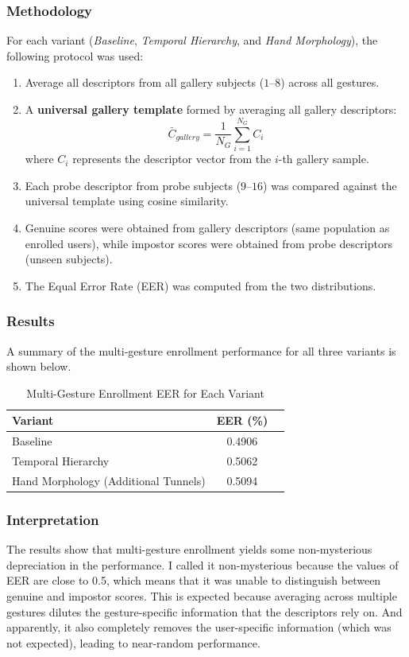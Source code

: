 \subsubsection*{Methodology}
For each variant (\textit{Baseline}, \textit{Temporal Hierarchy}, and \textit{Hand Morphology}),
the following protocol was used:
\begin{enumerate}
    \item Average all descriptors from all gallery subjects (\(1 \text{–} 8\)) across all gestures.
    \item A \textbf{universal gallery template} formed by averaging all gallery descriptors:
    \[
        \bar{C}_{gallery} = \frac{1}{N_G} \sum_{i=1}^{N_G} C_i
    \]
    where \(C_i\) represents the descriptor vector from the $i$-th gallery sample.
    \item Each probe descriptor from probe subjects (\(9 \text{–} 16\)) was compared against
          the universal template using cosine similarity.
    \item Genuine scores were obtained from gallery descriptors (same population as enrolled users),
          while impostor scores were obtained from probe descriptors (unseen subjects).
    \item The Equal Error Rate (EER) was computed from the two distributions.
\end{enumerate}

\subsubsection*{Results}
A summary of the multi-gesture enrollment performance for all three variants is shown below.

\begin{table}[H]
    \centering
    \caption{Multi-Gesture Enrollment EER for Each Variant}
    \label{tab:multi_gesture_eer}
    \begin{tabular}{lcc}
        \hline
        \textbf{Variant} & \textbf{EER (\%)} \\
        \hline
        Baseline & 0.4906 \\
        Temporal Hierarchy & 0.5062 \\
        Hand Morphology (Additional Tunnels) & 0.5094 \\
        \hline
    \end{tabular}
\end{table}

\subsubsection*{Interpretation}
The results show that multi-gesture enrollment yields some non-mysterious depreciation in the performance. I called it non-mysterious because the values of EER are close to 0.5, which means that it was unable to distinguish between genuine and impostor scores. This is expected because averaging across multiple gestures dilutes the gesture-specific information that the descriptors rely on. And apparently, it also completely removes the user-specific information (which was not expected), leading to near-random performance.




